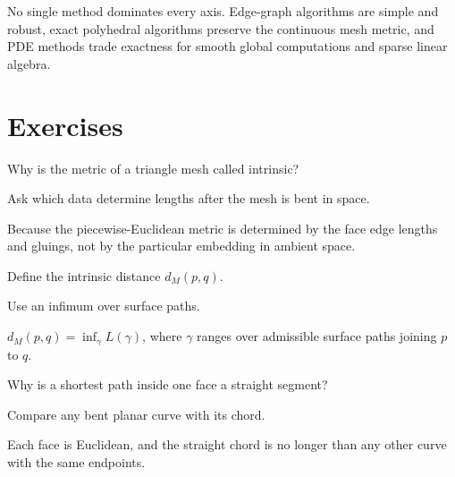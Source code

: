 No single method dominates every axis.  Edge-graph algorithms are simple and
robust, exact polyhedral algorithms preserve the continuous mesh metric, and PDE
methods trade exactness for smooth global computations and sparse linear algebra.

\section{Exercises}

\begin{exercise}\label{exr:vii38-01}
Why is the metric of a triangle mesh called intrinsic?
\end{exercise}

\begin{hint}
Ask which data determine lengths after the mesh is bent in space.
\end{hint}

\begin{solution}
Because the piecewise-Euclidean metric is determined by the face edge lengths and gluings, not by the particular embedding in ambient space.
\end{solution}

\begin{exercise}\label{exr:vii38-02}
Define the intrinsic distance \(d_M(p,q)\).
\end{exercise}

\begin{hint}
Use an infimum over surface paths.
\end{hint}

\begin{solution}
\(d_M(p,q)=\inf_\gamma L(\gamma)\), where \(\gamma\) ranges over admissible surface paths joining \(p\) to \(q\).
\end{solution}

\begin{exercise}\label{exr:vii38-03}
Why is a shortest path inside one face a straight segment?
\end{exercise}

\begin{hint}
Compare any bent planar curve with its chord.
\end{hint}

\begin{solution}
Each face is Euclidean, and the straight chord is no longer than any other curve with the same endpoints.
\end{solution}

